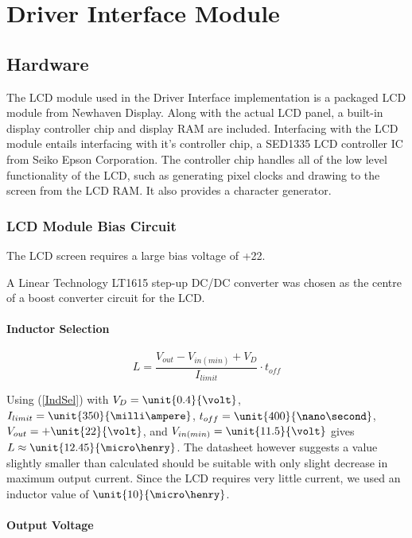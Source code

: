 \section{Driver Interface Module}

\subsection{Hardware}

The LCD module used in the Driver Interface implementation is a packaged LCD module from Newhaven Display. Along with the actual LCD panel, a built-in display controller chip and display RAM are included. Interfacing with the LCD module entails interfacing with it's controller chip, a SED1335 LCD controller IC from Seiko Epson Corporation. The controller chip handles all of the low level functionality of the LCD, such as generating pixel clocks and drawing to the screen from the LCD RAM. It also provides a character generator.

\subsubsection{LCD Module Bias Circuit}

The LCD screen requires a large bias voltage of +\unit{22}{\volt}.

A Linear Technology LT1615 step-up DC/DC converter was chosen as the centre of a boost converter circuit for the LCD.


\paragraph{Inductor Selection}

\begin{equation}
L=\frac{V_{out}-V_{in(min)}+V_{D}}{I_{limit}}\cdot t_{off}\label{IndSel}
\end{equation}


Using (\ref{IndSel}) with $V_{D}=\unit{0.4}{\volt}$, $I_{limit}=\unit{350}{\milli\ampere}$, $t_{off}=\unit{400}{\nano\second}$, $V_{out}=+\unit{22}{\volt}$, and $V_{in(min)}=\unit{11.5}{\volt}$ gives $L\approx\unit{12.45}{\micro\henry}$. The datasheet however suggests a value slightly smaller than calculated should be suitable with only slight decrease in maximum output current. Since the LCD requires very little current, we used an inductor value of $\unit{10}{\micro\henry}$.


\paragraph{Output Voltage}

